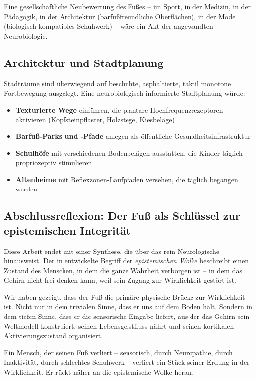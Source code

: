﻿\documentclass[12pt,a4paper]{report}
\theoremstyle{plain}
\theoremstyle{definition}
\theoremstyle{remark}
\begin{document}
Eine gesellschaftliche Neubewertung des Fußes -- im Sport,
in der Medizin, in der Pädagogik, in der Architektur
(barfußfreundliche Oberflächen), in der Mode (biologisch
kompatibles Schuhwerk) -- wäre ein Akt der angewandten
Neurobiologie.

\subsection{Architektur und Stadtplanung}

Stadträume sind überwiegend auf beschuhte, asphaltierte,
taktil monotone Fortbewegung ausgelegt. Eine neurobiologisch
informierte Stadtplanung würde:

\begin{itemize}
\item \textbf{Texturierte Wege} einführen, die plantare
  Hochfrequenzrezeptoren aktivieren (Kopfsteinpflaster,
  Holzstege, Kiesbeläge)
\item \textbf{Barfuß-Parks und -Pfade} anlegen als
  öffentliche Gesundheitsinfrastruktur
\item \textbf{Schulhöfe} mit verschiedenen Bodenbelägen
  ausstatten, die Kinder täglich propriozeptiv stimulieren
\item \textbf{Altenheime} mit Reflexzonen-Laufpfaden versehen,
  die täglich begangen werden
\end{itemize}

\subsection{Abschlussreflexion: Der Fuß als Schlüssel zur epistemischen Integrität}

Diese Arbeit endet mit einer Synthese, die über das rein
Neurologische hinausweist. Der in \cite{epp2026brn} entwickelte
Begriff der \emph{epistemischen Wolke} beschreibt einen Zustand
des Menschen, in dem die ganze Wahrheit verborgen ist -- in dem
das Gehirn nicht frei denken kann, weil sein Zugang zur
Wirklichkeit gestört ist.

Wir haben gezeigt, dass der Fuß die primäre physische Brücke
zur Wirklichkeit ist. Nicht nur in dem trivialen Sinne, dass
er uns auf dem Boden hält. Sondern in dem tiefen Sinne, dass er
die sensorische Eingabe liefert, aus der das Gehirn sein Weltmodell
konstruiert, seinen Lebensgeistfluss nährt und seinen kortikalen
Aktivierungszustand organisiert.

Ein Mensch, der seinen Fuß verliert -- sensorisch, durch
Neuropathie, durch Inaktivität, durch schlechtes Schuhwerk --
verliert ein Stück seiner Erdung in der Wirklichkeit. Er rückt
näher an die epistemische Wolke heran.
\end{document}
